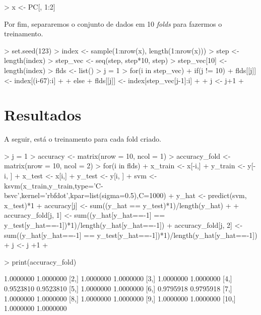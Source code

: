 \documentclass[12pt]{article}
\begin{document}
\begin{Schunk}
\begin{Sinput}
> x <- PC[, 1:2]
\end{Sinput}
\end{Schunk}

\par  Por fim, separaremos o conjunto de dados  em 10 \textit{folds} para fazermos o treinamento. 
  
\begin{Schunk}
\begin{Sinput}
> set.seed(123)
> index <- sample(1:nrow(x), length(1:nrow(x)))
> step <- length(index) %
> step_vec <- seq(step, step*10, step)
> step_vec[10] <- length(index)
> flds <- list()
> j = 1
> for(i in step_vec){
+   if(j != 10){
+     flds[[j]] <- index[(i-67):i]
+   }
+   else{
+     flds[[j]] <- index[step_vec[j-1]:i]
+   }
+   j <- j+1
+ }
\end{Sinput}
\end{Schunk}
  

\section{Resultados}

  \par A seguir, está o treinamento para cada fold criado. 

\begin{Schunk}
\begin{Sinput}
> j = 1
> accuracy <- matrix(nrow = 10, ncol = 1)
> accuracy_fold <- matrix(nrow = 10, ncol = 2)
> for(i in flds){
+   x_train <- x[-i,]
+   y_train <- y[-i, ]
+   x_test <- x[i,]
+   y_test <- y[i, ]
+   svm <- ksvm(x_train,y_train,type='C-bsvc',kernel='rbfdot',kpar=list(sigma=0.5),C=1000)
+   y_hat <- predict(svm, x_test)*1
+   accuracy[j] <- sum((y_hat == y_test)*1)/length(y_hat)
+   
+   accuracy_fold[j, 1] <- sum((y_hat[y_hat==-1] == y_test[y_hat==-1])*1)/length(y_hat[y_hat==-1])
+   accuracy_fold[j, 2] <-  sum((y_hat[y_hat==-1] == y_test[y_hat==-1])*1)/length(y_hat[y_hat==-1])
+   j <- j +1 
+ }
\end{Sinput}
\end{Schunk}


\begin{Schunk}
\begin{Sinput}
> print(accuracy_fold)
\end{Sinput}
\begin{Soutput}
           [,1]      [,2]
 [1,] 1.0000000 1.0000000
 [2,] 1.0000000 1.0000000
 [3,] 1.0000000 1.0000000
 [4,] 0.9523810 0.9523810
 [5,] 1.0000000 1.0000000
 [6,] 0.9795918 0.9795918
 [7,] 1.0000000 1.0000000
 [8,] 1.0000000 1.0000000
 [9,] 1.0000000 1.0000000
[10,] 1.0000000 1.0000000
\end{Soutput}
\end{Schunk}
\end{document}
